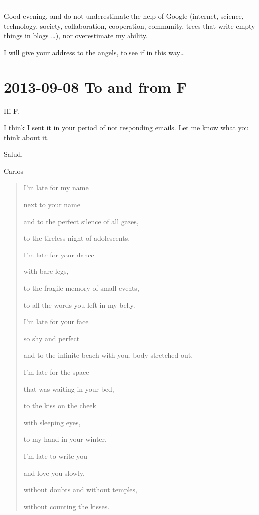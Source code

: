 \documentclass[]{book}
\begin{document}
\begin{center}\rule{0.5\linewidth}{\linethickness}\end{center}

Good evening, and do not underestimate the help of Google (internet, science, technology, society, collaboration, cooperation, community, trees that write empty things in blogs \ldots), nor overestimate my ability.

I will give your address to the angels, to see if in this way\ldots{}

\hypertarget{toF20130908}{%
\section*{2013-09-08 To and from F}\label{toF20130908}}

Hi F.

I think I sent it in your period of not responding emails. Let me know what you think about it.

Salud,

Carlos

\begin{quote}
I'm late for my name

next to your name

and to the perfect silence of all gazes,

to the tireless night of adolescents.

I'm late for your dance

with bare legs,

to the fragile memory of small events,

to all the words you left in my belly.

I'm late for your face

so shy and perfect

and to the infinite beach with your body stretched out.

I'm late for the space

that was waiting in your bed,

to the kiss on the cheek

with sleeping eyes,

to my hand in your winter.

I'm late to write you

and love you slowly,

without doubts and without temples,

without counting the kisses.
\end{quote}
\end{document}
